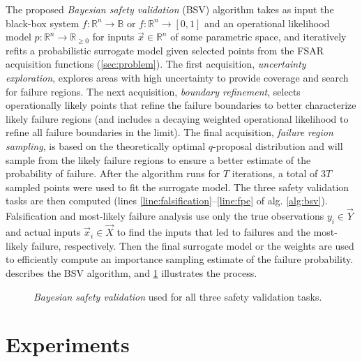 The proposed \textit{Bayesian safety validation} (BSV) algorithm takes as input the black-box system $f: \mathbb{R}^n \to \mathbb{B}$ or $f: \mathbb{R}^n \to [0,1]$ and an operational likelihood model $p: \mathbb{R}^n \to \mathbb{R}_{\ge 0}$ for inputs $\vec{x} \in \mathbb{R}^n$ of some parametric space, and iteratively refits a probabilistic surrogate model given selected points from the FSAR acquisition functions (\cref{sec:problem}).
The first acquisition, \textit{uncertainty exploration}, explores areas with high uncertainty to provide coverage and search for failure regions.
The next acquisition, \textit{boundary refinement}, selects operationally likely points that refine the failure boundaries to better characterize likely failure regions (and includes a decaying weighted operational likelihood to refine all failure boundaries in the limit).
The final acquisition, \textit{failure region sampling}, is based on the theoretically optimal $q$-proposal distribution \cite{kahn1953methods} and will sample from the likely failure regions to ensure a better estimate of the probability of failure.
After the algorithm runs for $T$ iterations, a total of $3T$ sampled points were used to fit the surrogate model.
The three safety validation tasks are then computed (lines \ref*{line:falsification}--\ref*{line:fpe} of alg. \ref{alg:bsv}).
Falsification and most-likely failure analysis use only the true observations $y_i \in \vec{Y}$ and actual inputs $\vec{x}_i \in \vec{X}$ to find the inputs that led to failures and the most-likely failure, respectively.
Then the final surrogate model or the weights are used to efficiently compute an importance sampling estimate of the failure probability.
 describes the BSV algorithm, and \cref{fig:algorithm} illustrates the process.


\begin{figure}[t!]
    
\end{figure}

\begin{figure}[b!]
    \centering
    \resizebox{\textwidth}{!}{
        
    }
    \caption{\textit{Bayesian safety validation} used for all three safety validation tasks.}
    \label{fig:algorithm}
\end{figure}


\section{Experiments}\label{sec:bsv_experiments}

